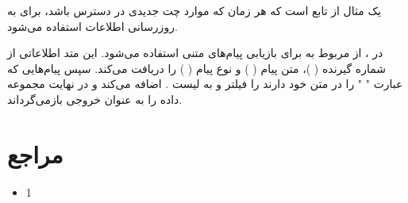 \documentclass{report}
\begin{document}
 یک مثال از تابع
است که هر زمان که موارد چت جدیدی در دسترس باشد، برای به روزرسانی اطلاعات استفاده می‌شود.

در
 ، از 
  مربوط به 
   برای بازیابی پیام‌های متنی استفاده می‌شود. این متد اطلاعاتی از شماره گیرنده 
   (
   )، متن پیام (
   ) 
   و نوع پیام (
   ) را دریافت می‌کند. سپس پیام‌هایی که عبارت "
   " را در متن خود دارند را فیلتر و به لیست
   .
    اضافه می‌کند و در نهایت مجموعه داده را به عنوان خروجی بازمی‌گرداند.
\chapter {مراجع}
\begin{itemize}
	\item 1
\end{itemize}
\end{document}
